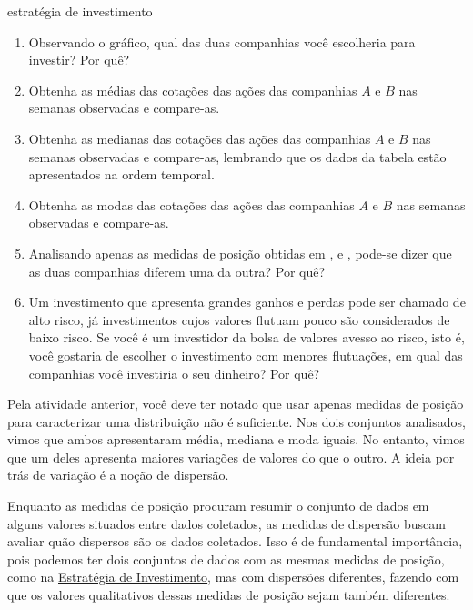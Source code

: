 \begin{task}{estratégia de investimento}
\begin{enumerate}
\item Observando o gráfico, qual das duas companhias você escolheria para investir? Por quê?

\item {} 
Obtenha as médias das cotações das ações das companhias $A$ e $B$ nas semanas observadas e compare-as.

\item {} 
Obtenha as medianas das cotações das ações das companhias $A$ e $B$ nas semanas observadas e compare-as, lembrando que os dados da tabela estão apresentados na ordem temporal.

\item {} 
Obtenha as modas das cotações das ações das companhias $A$ e $B$ nas semanas observadas e compare-as.

\item {} 
Analisando apenas as medidas de posição obtidas em ,  e , pode-se dizer que as duas companhias diferem uma da outra? Por quê?

\item {} 
Um investimento que apresenta grandes ganhos e perdas pode ser chamado de alto risco, já investimentos cujos valores flutuam pouco são considerados de baixo risco. Se você é um investidor da bolsa de valores avesso ao risco, isto é, você gostaria de escolher o investimento com menores flutuações, em qual das companhias você investiria o seu dinheiro? Por quê?

\end{enumerate}
\end{task}

\label{\detokenize{PE104-4:sec-organizando2}}\label{\detokenize{PE104-4::doc}}\label{\detokenize{PE104-4:organizando-as-ideias-medidas-de-dispersao}}

Pela atividade anterior, você deve ter notado que usar apenas medidas de posição para caracterizar uma distribuição não é suficiente. Nos dois conjuntos analisados, vimos que ambos apresentaram média, mediana e moda iguais. No entanto, vimos que um deles apresenta maiores variações de valores do que o outro. A ideia por trás de variação é a noção de dispersão.

Enquanto as medidas de posição procuram resumir o conjunto de dados em alguns valores situados entre dados coletados, as medidas de dispersão buscam avaliar quão dispersos são os dados coletados. Isso é de fundamental importância, pois podemos ter dois conjuntos de dados com as mesmas medidas de posição, como na \hyperref[\detokenize{PE104-3:ativ-estrategia-de-investimento}]{Estratégia de Investimento}, mas com dispersões diferentes, fazendo com que os valores qualitativos dessas medidas de posição sejam também diferentes.

